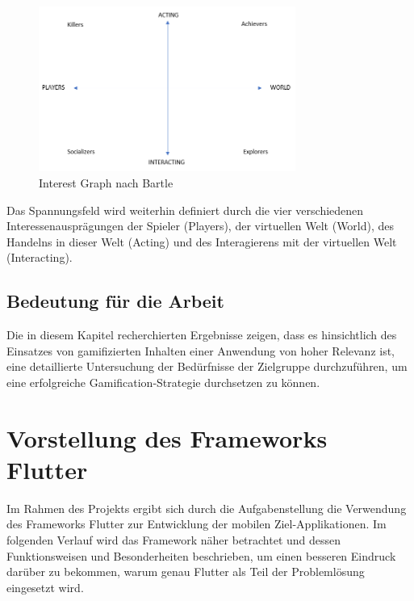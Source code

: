 \documentclass[bibliography=totoc,listof=totoc,BCOR=5mm,DIV=12,oneside]{scrbook}
\begin{document}
\bigskip
\begin{figure}[H]
	\centering
	\includegraphics[width=0.75\textwidth, keepaspectratio]{Bilder/Diagramme/InterestGraphBartle.png}
	\caption{Interest Graph nach Bartle \cite{bartle1996hearts}}
	\label{img:interetGraphBartle}
\end{figure}

\par \bigskip Das Spannungsfeld wird weiterhin definiert durch die vier verschiedenen Interessenausprägungen der Spieler (Players), der virtuellen Welt (World), des Handelns in dieser Welt (Acting) und des Interagierens mit der virtuellen Welt (Interacting).

\subsection{Bedeutung für die Arbeit}
\par Die in diesem Kapitel recherchierten Ergebnisse zeigen, dass es hinsichtlich des Einsatzes von gamifizierten Inhalten einer Anwendung von hoher Relevanz ist, eine detaillierte Untersuchung der Bedürfnisse der Zielgruppe durchzuführen, um eine erfolgreiche Gamification-Strategie durchsetzen zu können.
\\
\newpage
\section{Vorstellung des Frameworks Flutter}
\label{chap:flutter}
\par Im Rahmen des Projekts ergibt sich durch die Aufgabenstellung die Verwendung des Frameworks Flutter zur Entwicklung der mobilen Ziel-Applikationen. Im folgenden Verlauf wird das Framework näher betrachtet und dessen Funktionsweisen und Besonderheiten beschrieben, um einen besseren Eindruck darüber zu bekommen, warum genau Flutter als Teil der Problemlösung eingesetzt wird.
\end{document}
